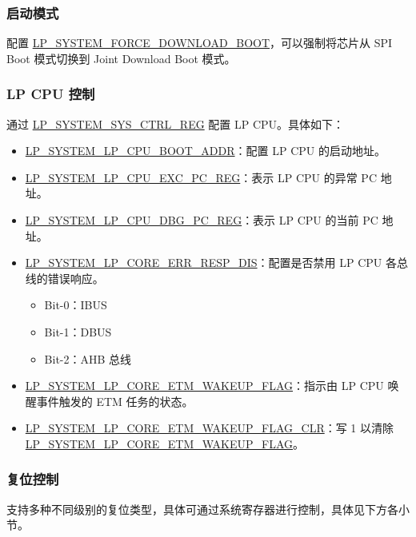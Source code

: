 \documentclass[main\_\_CN.tex]{subfiles}
\begin{document}
\subsubsection{启动模式}

配置 \hyperref[fielddesc:LPSYSTEMFORCEDOWNLOADBOOT]{LP\_SYSTEM\_FORCE\_DOWNLOAD\_BOOT}，可以强制将芯片从 SPI Boot 模式切换到 Joint Download Boot 模式。

\subsubsection{LP CPU 控制}

通过 \hyperref[regdesc:LPSYSTEMSYSCTRLREG]{LP\_SYSTEM\_SYS\_CTRL\_REG} 配置 LP CPU。具体如下：

\begin{itemize}
    \item \hyperref[fielddesc:LPSYSTEMLPCPUBOOTADDR]{LP\_SYSTEM\_LP\_CPU\_BOOT\_ADDR}：配置 LP CPU 的启动地址。
    \item \hyperref[regdesc:LPSYSTEMLPCPUEXCPCREG]{LP\_SYSTEM\_LP\_CPU\_EXC\_PC\_REG}：表示 LP CPU 的异常 PC 地址。
    \item \hyperref[regdesc:LPSYSTEMLPCPUDBGPCREG]{LP\_SYSTEM\_LP\_CPU\_DBG\_PC\_REG}：表示 LP CPU 的当前 PC 地址。
    \item \hyperref[fielddesc:LPSYSTEMLPCOREERRRESPDIS]{LP\_SYSTEM\_LP\_CORE\_ERR\_RESP\_DIS}：配置是否禁用 LP CPU 各总线的错误响应。
        \begin{itemize}
            \item Bit-0：IBUS
            \item Bit-1：DBUS
            \item Bit-2：AHB 总线
        \end{itemize}
    \item \hyperref[fielddesc:LPSYSTEMLPCOREETMWAKEUPFLAG]{LP\_SYSTEM\_LP\_CORE\_ETM\_WAKEUP\_FLAG}：指示由 LP CPU 唤醒事件触发的 ETM 任务的状态。
    \item \hyperref[fielddesc:LPSYSTEMLPCOREETMWAKEUPFLAGCLR]{LP\_SYSTEM\_LP\_CORE\_ETM\_WAKEUP\_FLAG\_CLR}：写 1 以清除 \hyperref[fielddesc:LPSYSTEMLPCOREETMWAKEUPFLAG]{LP\_SYSTEM\_LP\_CORE\_ETM\_WAKEUP\_FLAG}。
\end{itemize}


\subsubsection{复位控制}

\chipname{} 支持多种不同级别的复位类型，具体可通过系统寄存器进行控制，具体见下方各小节。
\end{document}
